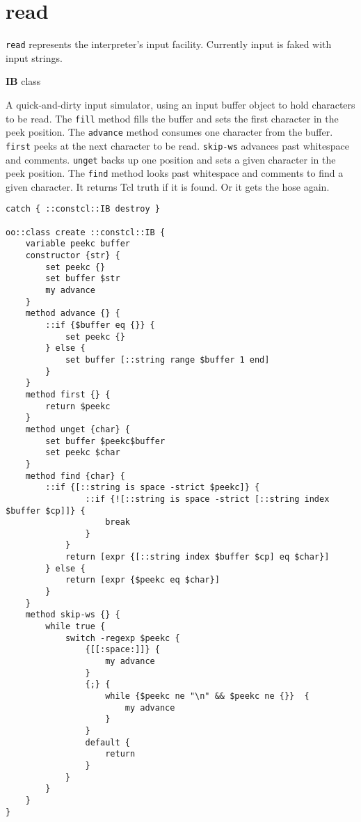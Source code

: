 \documentclass{report}
\begin{document}
\section{read}
\label{read}

\texttt{read} represents the interpreter's input facility. Currently input is faked with input strings.


\textbf{IB} class


A quick-and-dirty input simulator, using an input buffer object to hold characters to be read. The \texttt{fill} method fills the buffer and sets the first character in the peek position. The \texttt{advance} method consumes one character from the buffer. \texttt{first} peeks at the next character to be read. \texttt{skip-ws} advances past whitespace and comments. \texttt{unget} backs up one position and sets a given character in the peek position. The \texttt{find} method looks past whitespace and comments to find a given character. It returns Tcl truth if it is found. Or it gets the hose again.

\noindent\makebox[\linewidth]{\rule{\linewidth}{0.4pt}}
\begin{lstlisting}
catch { ::constcl::IB destroy }
 
oo::class create ::constcl::IB {
    variable peekc buffer
    constructor {str} {
        set peekc {}
        set buffer $str
        my advance
    }
    method advance {} {
        ::if {$buffer eq {}} {
            set peekc {}
        } else {
            set buffer [::string range $buffer 1 end]
        }
    }
    method first {} {
        return $peekc
    }
    method unget {char} {
        set buffer $peekc$buffer
        set peekc $char
    }
    method find {char} {
        ::if {[::string is space -strict $peekc]} {
                ::if {![::string is space -strict [::string index $buffer $cp]]} {
                    break
                }
            }
            return [expr {[::string index $buffer $cp] eq $char}]
        } else {
            return [expr {$peekc eq $char}]
        }
    }
    method skip-ws {} {
        while true {
            switch -regexp $peekc {
                {[[:space:]]} {
                    my advance
                }
                {;} {
                    while {$peekc ne "\n" && $peekc ne {}}  {
                        my advance
                    }
                }
                default {
                    return
                }
            }
        }
    }
}
 
\end{lstlisting}
\noindent\makebox[\linewidth]{\rule{\linewidth}{0.4pt}}
\end{document}
